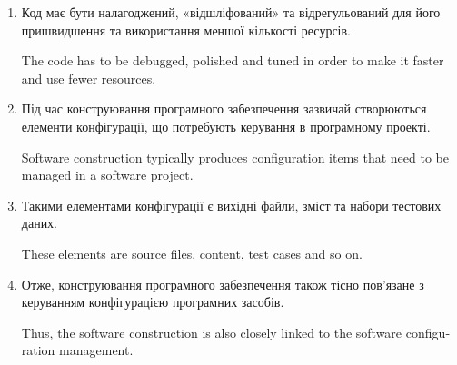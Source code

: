 \documentclass[a4paper,oneside,12pt,DIV=9]{scrartcl}
\begin{document}
\begin{enumerate}
		\item Код має бути налагоджений, «відшліфований» та відрегульований для його пришвидшення та використання меншої кількості ресурсів.
		
		\begin{english}
			The code has to be debugged, polished and tuned in order to make it faster and use fewer resources.
		\end{english}
		
		\item Під час конструювання програмного забезпечення зазвичай створюються елементи конфігурації, що потребують керування в програмному проекті.
		
		\begin{english}
			Software construction typically produces configuration items that need to be managed in a software project.
		\end{english}
		
		\item Такими елементами конфігурації є вихідні файли, зміст та набори тестових даних.
		
		\begin{english}
			These elements are source files, content, test cases and so on.
		\end{english}
		
		\item Отже, конструювання програмного забезпечення також тісно пов'\-я\-за\-не з керуванням конфігурацією програмних засобів.
		
		\begin{english}
			Thus, the software construction is also closely linked to the software configuration management.
		\end{english}
	\end{enumerate}
\end{document}
